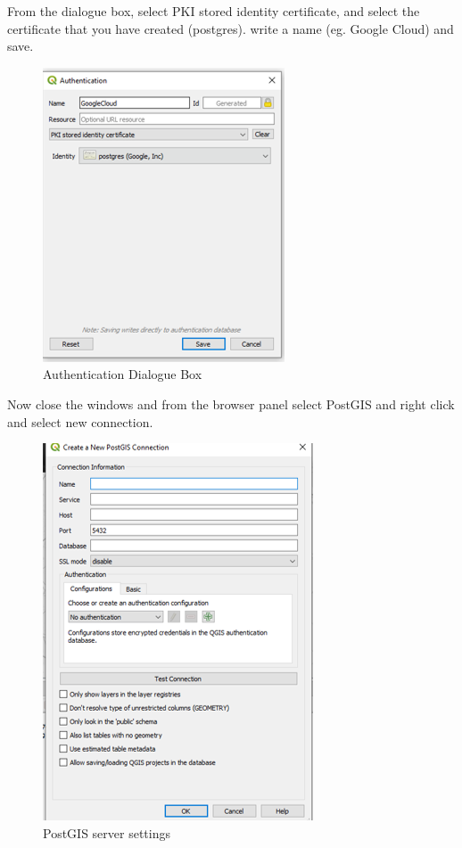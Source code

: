 \documentclass[
]{book}
\begin{document}
From the dialogue box, select PKI stored identity certificate, and select the certificate that you have created (postgres). write a name (eg. Google Cloud) and save.

\begin{figure}
\centering
\includegraphics{Images/authentication2.png}
\caption{Authentication Dialogue Box}
\end{figure}

Now close the windows and from the browser panel select PostGIS and right click and select new connection.

\begin{figure}
\centering
\includegraphics{Images/postgisServer.png}
\caption{PostGIS server settings}
\end{figure}
\end{document}
